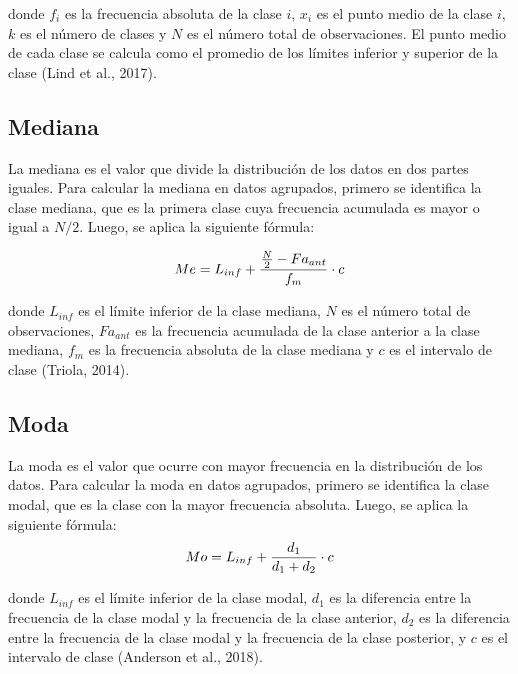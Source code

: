 \documentclass[
  spanish,
  letterpaper,
]{book}
\begin{document}
donde \(f_i\)\hspace{0pt} es la frecuencia absoluta de la clase \(i\),
\(x_i\)\hspace{0pt} es el punto medio de la clase \(i\), \(k\) es el
número de clases y \(N\) es el número total de observaciones. El punto
medio de cada clase se calcula como el promedio de los límites inferior
y superior de la clase (Lind et al., 2017).

\subsection{Mediana}\label{mediana-2}

La mediana es el valor que divide la distribución de los datos en dos
partes iguales. Para calcular la mediana en datos agrupados, primero se
identifica la clase mediana, que es la primera clase cuya frecuencia
acumulada es mayor o igual a \(N/2\). Luego, se aplica la siguiente
fórmula:

\[\huge Me = L_{inf} + \frac{\frac{N}{2} - Fa_{ant}}{f_m} \cdot c\]

donde \(L_{inf}\)\hspace{0pt} es el límite inferior de la clase mediana,
\(N\) es el número total de observaciones, \(Fa_{ant}\)\hspace{0pt} es
la frecuencia acumulada de la clase anterior a la clase mediana,
\(f_m\)\hspace{0pt} es la frecuencia absoluta de la clase mediana y
\(c\) es el intervalo de clase (Triola, 2014).

\subsection{Moda}\label{moda-2}

La moda es el valor que ocurre con mayor frecuencia en la distribución
de los datos. Para calcular la moda en datos agrupados, primero se
identifica la clase modal, que es la clase con la mayor frecuencia
absoluta. Luego, se aplica la siguiente fórmula:
\[ \huge Mo = L_{inf} + \frac{d_1}{d_1 + d_2} \cdot c\]

donde \(L_{inf}\)\hspace{0pt} es el límite inferior de la clase modal,
\(d_1\)\hspace{0pt} es la diferencia entre la frecuencia de la clase
modal y la frecuencia de la clase anterior, \(d_2\)\hspace{0pt} es la
diferencia entre la frecuencia de la clase modal y la frecuencia de la
clase posterior, y \(c\) es el intervalo de clase (Anderson et al.,
2018).
\end{document}
